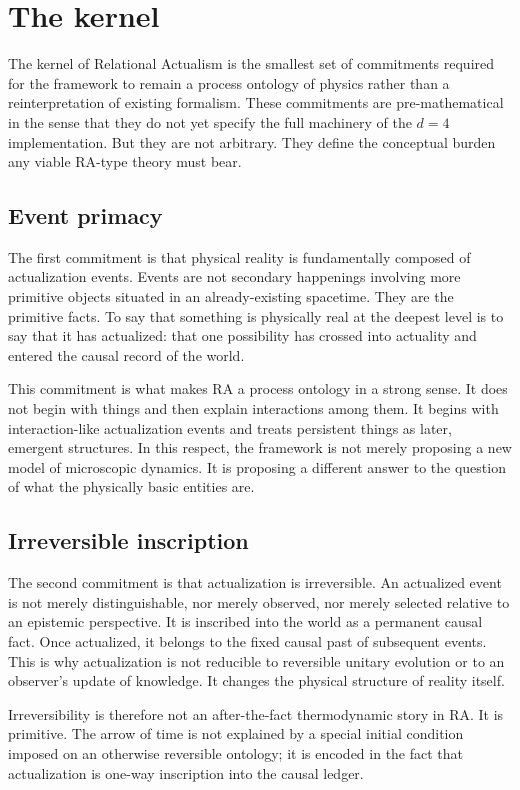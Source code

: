 \documentclass[11pt]{article}
\begin{document}
\section{The kernel}\label{sec:kernel}
The kernel of Relational Actualism is the smallest set of commitments required for the framework to remain a process ontology of physics rather than a reinterpretation of existing formalism. These commitments are pre-mathematical in the sense that they do not yet specify the full machinery of the $d=4$ implementation. But they are not arbitrary. They define the conceptual burden any viable RA-type theory must bear.

\subsection{Event primacy}
The first commitment is that physical reality is fundamentally composed of actualization events. Events are not secondary happenings involving more primitive objects situated in an already-existing spacetime. They are the primitive facts. To say that something is physically real at the deepest level is to say that it has actualized: that one possibility has crossed into actuality and entered the causal record of the world.

This commitment is what makes RA a process ontology in a strong sense. It does not begin with things and then explain interactions among them. It begins with interaction-like actualization events and treats persistent things as later, emergent structures. In this respect, the framework is not merely proposing a new model of microscopic dynamics. It is proposing a different answer to the question of what the physically basic entities are.

\subsection{Irreversible inscription}
The second commitment is that actualization is irreversible. An actualized event is not merely distinguishable, nor merely observed, nor merely selected relative to an epistemic perspective. It is inscribed into the world as a permanent causal fact. Once actualized, it belongs to the fixed causal past of subsequent events. This is why actualization is not reducible to reversible unitary evolution or to an observer's update of knowledge. It changes the physical structure of reality itself.

Irreversibility is therefore not an after-the-fact thermodynamic story in RA. It is primitive. The arrow of time is not explained by a special initial condition imposed on an otherwise reversible ontology; it is encoded in the fact that actualization is one-way inscription into the causal ledger.
\end{document}
